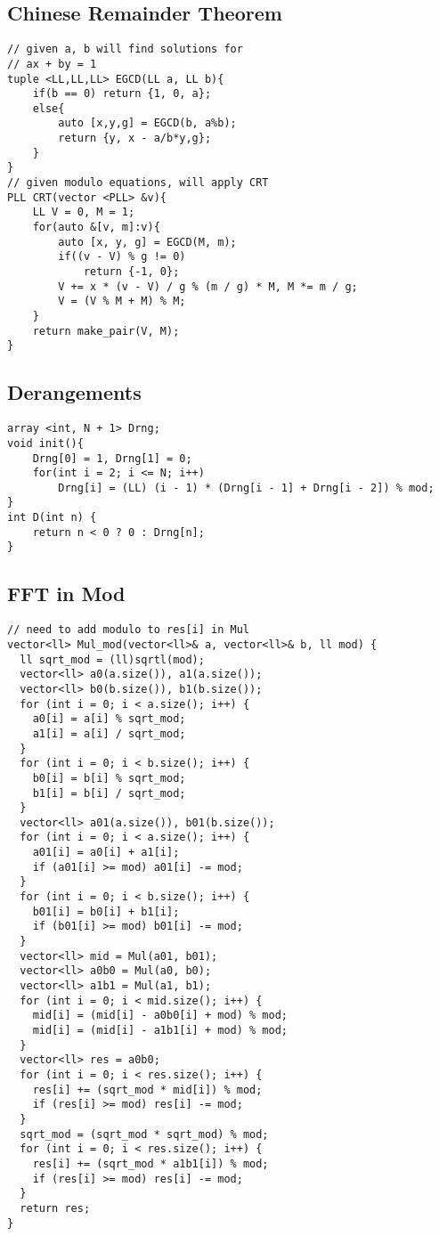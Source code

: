 \documentclass[10pt,a4paper,onesided]{article}
\begin{document}
\begin{multicols*}{3}
\begin{lstlisting}
\end{lstlisting}
\subsection{Chinese Remainder Theorem}
\begin{lstlisting}
// given a, b will find solutions for
// ax + by = 1
tuple <LL,LL,LL> EGCD(LL a, LL b){
    if(b == 0) return {1, 0, a};
    else{
        auto [x,y,g] = EGCD(b, a%b);
        return {y, x - a/b*y,g};
    }
}
// given modulo equations, will apply CRT
PLL CRT(vector <PLL> &v){
    LL V = 0, M = 1;
    for(auto &[v, m]:v){
        auto [x, y, g] = EGCD(M, m);
        if((v - V) % g != 0)
            return {-1, 0};
        V += x * (v - V) / g % (m / g) * M, M *= m / g;
        V = (V % M + M) % M;
    }
    return make_pair(V, M);
}\end{lstlisting}
\subsection{Derangements}
\begin{lstlisting}
array <int, N + 1> Drng;
void init(){
    Drng[0] = 1, Drng[1] = 0;
    for(int i = 2; i <= N; i++)
        Drng[i] = (LL) (i - 1) * (Drng[i - 1] + Drng[i - 2]) % mod;
}
int D(int n) { 
    return n < 0 ? 0 : Drng[n];
}\end{lstlisting}
\subsection{FFT in Mod}
\begin{lstlisting}
// need to add modulo to res[i] in Mul
vector<ll> Mul_mod(vector<ll>& a, vector<ll>& b, ll mod) {
  ll sqrt_mod = (ll)sqrtl(mod);
  vector<ll> a0(a.size()), a1(a.size());
  vector<ll> b0(b.size()), b1(b.size());
  for (int i = 0; i < a.size(); i++) {
    a0[i] = a[i] % sqrt_mod;
    a1[i] = a[i] / sqrt_mod;
  }
  for (int i = 0; i < b.size(); i++) {
    b0[i] = b[i] % sqrt_mod;
    b1[i] = b[i] / sqrt_mod;
  }
  vector<ll> a01(a.size()), b01(b.size());
  for (int i = 0; i < a.size(); i++) {
    a01[i] = a0[i] + a1[i];
    if (a01[i] >= mod) a01[i] -= mod;
  }
  for (int i = 0; i < b.size(); i++) {
    b01[i] = b0[i] + b1[i];
    if (b01[i] >= mod) b01[i] -= mod;
  }
  vector<ll> mid = Mul(a01, b01);
  vector<ll> a0b0 = Mul(a0, b0);
  vector<ll> a1b1 = Mul(a1, b1);
  for (int i = 0; i < mid.size(); i++) {
    mid[i] = (mid[i] - a0b0[i] + mod) % mod;
    mid[i] = (mid[i] - a1b1[i] + mod) % mod;
  }
  vector<ll> res = a0b0;
  for (int i = 0; i < res.size(); i++) {
    res[i] += (sqrt_mod * mid[i]) % mod;
    if (res[i] >= mod) res[i] -= mod;
  }
  sqrt_mod = (sqrt_mod * sqrt_mod) % mod;
  for (int i = 0; i < res.size(); i++) {
    res[i] += (sqrt_mod * a1b1[i]) % mod;
    if (res[i] >= mod) res[i] -= mod;
  }
  return res;
} 
\end{lstlisting}

\end{multicols*}
\end{document}
